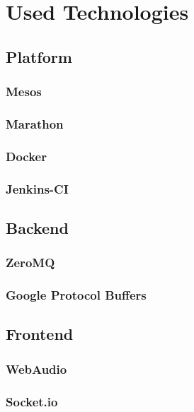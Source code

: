 \chapter{Used Technologies}
\blindtext

\section{Platform}
\blindtext

\subsection{Mesos}
\blindtext

\subsection{Marathon}
\blindtext

\subsection{Docker}
\blindtext

\subsection{Jenkins-CI}
\blindtext


\section{Backend}
\blindtext

\subsection{ZeroMQ}
\blindtext

\subsection{Google Protocol Buffers}
\blindtext


\section{Frontend}
\blindtext

\subsection{WebAudio}
\blindtext

\subsection{Socket.io}
\blindtext

